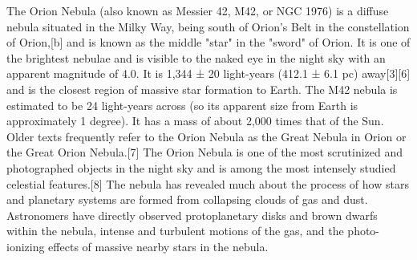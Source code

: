 The Orion Nebula (also known as Messier 42, M42, or NGC 1976) is a diffuse nebula situated in the Milky Way, being south of Orion's Belt in the constellation of Orion,[b] and is known as the middle "star" in the "sword" of Orion. It is one of the brightest nebulae and is visible to the naked eye in the night sky with an apparent magnitude of 4.0. It is 1,344 ± 20 light-years (412.1 ± 6.1 pc) away[3][6] and is the closest region of massive star formation to Earth. The M42 nebula is estimated to be 24 light-years across (so its apparent size from Earth is approximately 1 degree). It has a mass of about 2,000 times that of the Sun. Older texts frequently refer to the Orion Nebula as the Great Nebula in Orion or the Great Orion Nebula.[7] The Orion Nebula is one of the most scrutinized and photographed objects in the night sky and is among the most intensely studied celestial features.[8] The nebula has revealed much about the process of how stars and planetary systems are formed from collapsing clouds of gas and dust. Astronomers have directly observed protoplanetary disks and brown dwarfs within the nebula, intense and turbulent motions of the gas, and the photo-ionizing effects of massive nearby stars in the nebula.
